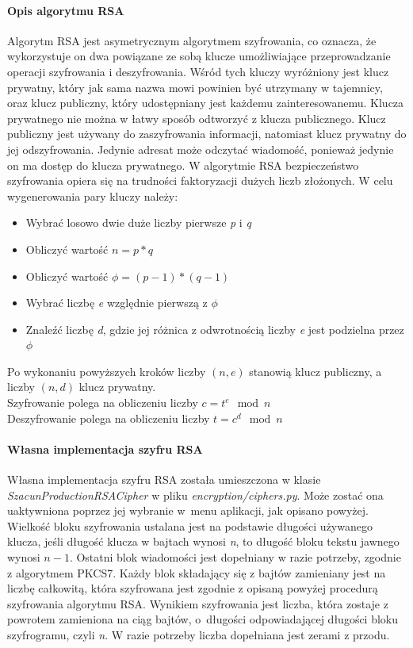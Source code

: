 \documentclass{article}
\begin{document}
      \paragraph{Opis algorytmu RSA}
        Algorytm RSA jest asymetrycznym algorytmem szyfrowania, co oznacza, że wykorzystuje on dwa powiązane ze sobą
        klucze umożliwiające przeprowadzanie operacji szyfrowania i deszyfrowania. Wśród tych kluczy wyróżniony jest
        klucz prywatny, który jak sama nazwa mowi powinien być utrzymany w tajemnicy, oraz klucz publiczny, który
        udostępniany jest każdemu zainteresowanemu. Klucza prywatnego nie można w łatwy sposób odtworzyć z klucza
        publicznego. Klucz publiczny jest używany do zaszyfrowania informacji, natomiast klucz prywatny do jej odszyfrowania.
        Jedynie adresat może odczytać wiadomość, ponieważ jedynie on ma dostęp do klucza prywatnego. W algorytmie RSA
        bezpieczeństwo szyfrowania opiera się na trudności faktoryzacji dużych liczb złożonych.  W celu wygenerowania
        pary kluczy należy:
        \begin{itemize}
          \item Wybrać losowo dwie duże liczby pierwsze \emph{p} i \emph{q}
          \item Obliczyć wartość \( n = p * q \)
          \item Obliczyć wartość \( \phi = (p - 1) * (q - 1) \)
          \item Wybrać liczbę \emph{e} względnie pierwszą z \( \phi \)
          \item Znaleźć liczbę \emph{d}, gdzie jej różnica z odwrotnością liczby \emph{e} jest podzielna przez \( \phi \)
      \end{itemize}
      Po wykonaniu powyższych kroków liczby \( (n,e) \) stanowią klucz publiczny, a liczby \( (n,d) \) klucz prywatny. \\
      Szyfrowanie polega na obliczeniu liczby \( c = t^e\mod n \) \\
      Deszyfrowanie polega na obliczeniu liczby \( t = c^d\mod n \)

      \paragraph{Własna implementacja szyfru RSA}
        Własna implementacja szyfru RSA została umieszczona w klasie \emph{SzacunProductionRSACipher} w pliku
        \emph{encryption/ciphers.py}.
        Może zostać ona uaktywniona poprzez jej wybranie w~menu aplikacji, jak opisano powyżej. Wielkość bloku szyfrowania
        ustalana jest na podstawie długości używanego klucza, jeśli długość klucza w bajtach wynosi \emph{n}, to długość
        bloku tekstu jawnego wynosi \( n - 1 \). Ostatni blok wiadomości jest dopełniany w razie potrzeby, zgodnie z
        algorytmem PKCS7. Każdy blok składający się z bajtów zamieniany jest na liczbę całkowitą,
        która szyfrowana jest zgodnie z opisaną powyżej procedurą szyfrowania algorytmu RSA. Wynikiem szyfrowania jest
        liczba, która zostaje z powrotem zamieniona na ciąg bajtów, o~długości odpowiadającej długości bloku szyfrogramu,
        czyli \emph{n}. W razie potrzeby liczba dopełniana jest zerami z przodu.
\end{document}
